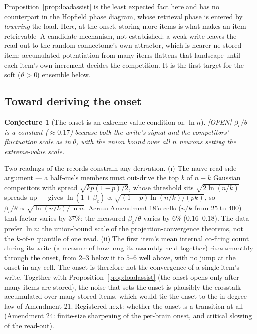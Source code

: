 \documentclass[11pt]{article}
\theoremstyle{definition}
\theoremstyle{plain}
\newtheorem{conjecture}[lemma]{Conjecture}
\newcommand{\OPEN}{\textnormal{\footnotesize\textsf{[OPEN]}}}
\begin{document}
Proposition~\ref{prop:loadassist} is the least expected fact here and has no
counterpart in the Hopfield phase diagram, whose retrieval phase is entered
by \emph{lowering} the load. Here, at the onset, storing more items is what
makes an item retrievable. A candidate mechanism, not established: a weak
write leaves the read-out to the random connectome's own attractor, which is
nearer no stored item; accumulated potentiation from many items flattens that
landscape until each item's own increment decides the competition. It is the
first target for the soft ($\vartheta > 0$) ensemble below.


\subsection{Toward deriving the onset}

\begin{conjecture}[The onset is an extreme-value condition on $\ln n$]\label{conj:onset} \OPEN
$\beta_c / \theta$ is a constant ($\approx 0.17$) because both the write's
signal and the competitors' fluctuation scale as in $\theta$, with the
\emph{union bound over all $n$ neurons} setting the extreme-value scale.
\end{conjecture}

Two readings of the records constrain any derivation. (i) The naive
read-side argument --- a half-cue's members must out-drive the top $k$ of
$n - k$ Gaussian competitors with spread $\sqrt{kp(1-p)/2}$, whose threshold
sits $\sqrt{2\ln(n/k)}$ spreads up --- gives
$\ln(1+\beta_c) \propto \sqrt{(1-p)\ln(n/k)/(pk)}$, so $\beta_c/\theta \propto
\sqrt{\ln(n/k)/\ln n}$. Across Amendment 18's cells ($n/k$ from $25$ to $400$)
that factor varies by $37\%$; the measured $\beta_c/\theta$ varies by $6\%$
($0.16$--$0.18$). The data prefer $\ln n$: the union-bound scale of the
projection-convergence theorems, not the $k$-of-$n$ quantile of one read.
(ii) The first item's mean internal co-firing count during its write (a
measure of how long its assembly held together) rises smoothly through the
onset, from $2$--$3$ below it to $5$--$6$ well above, with no jump at the onset
in any cell. The onset is therefore not the convergence of a single item's
write. Together with Proposition~\ref{prop:loadassist} (the onset opens only
after many items are stored), the noise that sets the onset is plausibly the
crosstalk accumulated over many stored items, which would tie the onset to
the in-degree law of Amendment 21. Registered next: whether the onset is a
transition at all (Amendment 24: finite-size sharpening of the per-brain
onset, and critical slowing of the read-out).
\end{document}
